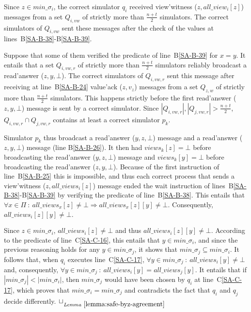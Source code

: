 \documentclass[11pt,letterpaper]{article}
\newlength {\afterproof}
\newcommand{\toto}{xxx}
\newenvironment{proofL}{\noindent{\bf Proof }}
{\hspace*{\fill}$\Box_{\mathit{Lemma}~\ref{\toto}}$\par\vspace{\afterproof}}
\begin{document}
\begin{proofL}
Since $z\in min\_\sigma_i$, the correct simulator $q_i$ received
{\sc view'witness} ($z,all\_view_i[z]$) messages
from a set $Q_{i,vw}$ of strictly more than $\frac{n+t}{2}$ simulators.
The correct simulators of $Q_{i,vw}$ sent these messages
after the check of the values at lines~B\ref{SA-B-38}-B\ref{SA-B-39}.

Suppose that some of them verified the predicate of line~B\ref{SA-B-39}
for $x=y$.
It entails  that a set  $Q_{i,vw,r}$ of strictly more  than $\frac{n+t}{2}$
simulators reliably broadcast a {\sc read'answer} ($z,y,\bot$).
The correct simulators of $Q_{i,vw,r}$ sent this message after receiving at
line~B\ref{SA-B-24}  {\sc value'ack} ($z,v_z$) messages from a set $Q_{z,w}$
of strictly more than $\frac{n+t}{2}$ simulators.
This  happens  strictly before  the  first  {\sc read'answer}  ($z,y,\bot$)
message is sent by a correct simulator.
Since       $|Q_{i,vw,r}|,|Q_{j,vw,r}|>\frac{n+t}{2}$,      $Q_{i,vw,r}\cap
Q_{j,vw,r}$  contains
at least a correct simulator $p_k$.


Simulator $p_k$ thus broadcast a {\sc read'answer} ($y,z,\bot$) message
and a {\sc read'answer} ($z,y,\bot$) message (line B\ref{SA-B-26}). It then 
had  $views_k[z] = \bot$ before broadcasting the  
{\sc read'answer} ($y,z,\bot$) message and $views_k[y] = \bot$ before 
broadcasting the {\sc read'answer} ($z,y,\bot$).
Because of the first instruction of line~B\ref{SA-B-25} this is impossible,
and thus each correct
process that sends a {\sc view'witness} ($z,all\_views_i[z]$) message ended
the wait instruction
of   lines~B\ref{SA-B-38}-B\ref{SA-B-39}  by   verifying  the   predicate  of
line~B\ref{SA-B-38}. 
This entails that
$\forall x\in\Pi~:~all\_views_x[z]\neq\bot \Rightarrow
all\_views_x[z][y]\neq\bot$.   Consequently, $all\_views_i[z][y]\neq\bot$.

Since $z\in min\_\sigma_i$, $all\_views_i[z]\neq\bot$ and thus
$all\_views_i[z][y]\neq\bot$.
According to the predicate of line~C\ref{SA-C-16}, this entails that
$y\in min\_\sigma_i$, and since the previous reasoning holds for any
$y\in min\_\sigma_j$, it shows that $min\_\sigma_j\subseteq min\_\sigma_i$.
It follows that, when $q_i$ executes line~C\ref{SA-C-17}, $\forall y\in
min\_\sigma_j~:~all\_views_i[y]\neq\bot$ and,
consequently, $\forall y\in
min\_\sigma_j~:~all\_views_i[y]=all\_views_j[y]$. It entails that if
$|min\_\sigma_j|<|min\_\sigma_i|$,
then $min\_\sigma_j$ would have been chosen by $q_i$ at
line~C\ref{SA-C-17}, which proves that $min\_\sigma_i=min\_\sigma_j$
and contradicts the fact that $q_i$ and $q_j$ decide differently.
\renewcommand{\toto}{lemma:safe-byz-agreement}
\end{proofL}
\end{document}
